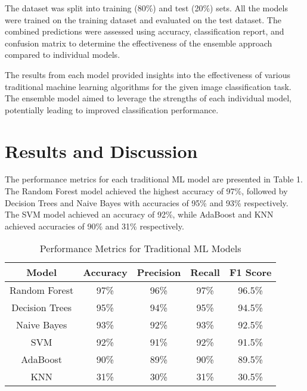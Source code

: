 \documentclass[10pt,twocolumn,letterpaper]{article}
\begin{document}
The dataset was split into training (80\%) and test (20\%) sets. All the models were trained on the training dataset and evaluated on the test dataset. The combined predictions were assessed using accuracy, classification report, and confusion matrix to determine the effectiveness of the ensemble approach compared to individual models.

The results from each model provided insights into the effectiveness of various traditional machine learning algorithms for the given image classification task. The ensemble model aimed to leverage the strengths of each individual model, potentially leading to improved classification performance.



\section{Results and Discussion}
The performance metrics for each traditional ML model are presented in Table 1. The Random Forest model achieved the highest accuracy of 97\%, followed by Decision Trees and Naive Bayes with accuracies of 95\% and 93\% respectively. The SVM model achieved an accuracy of 92\%, while AdaBoost and KNN achieved accuracies of 90\% and 31\% respectively.

\begin{table}[h]
    \centering
    \begin{tabular}{|c|c|c|c|c|}
        \hline
        \textbf{Model} & \textbf{Accuracy} & \textbf{Precision} & \textbf{Recall} & \textbf{F1 Score} \\
        \hline
        Random Forest & 97\% & 96\% & 97\% & 96.5\% \\
        Decision Trees & 95\% & 94\% & 95\% & 94.5\% \\
        Naive Bayes & 93\% & 92\% & 93\% & 92.5\% \\
        SVM & 92\% & 91\% & 92\% & 91.5\% \\
        AdaBoost & 90\% & 89\% & 90\% & 89.5\% \\
        KNN & 31\% & 30\% & 31\% & 30.5\% \\
        \hline
    \end{tabular}
    \caption{Performance Metrics for Traditional ML Models}
    \label{tab:performance}
\end{table}
\end{document}
